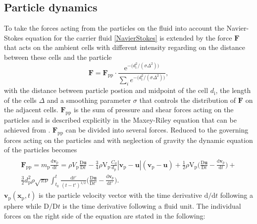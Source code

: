 \documentclass[11pt,a4paper,openany,oneside,parskip=half*]{article}
\renewcommand*\vec[1]{\boldsymbol{#1}}
\begin{document}
\subsection{Particle dynamics} %
To take the forces acting from the particles on the fluid into account the Navier-Stokes equation for the carrier fluid \eqref{NavierStokes} is extended by the force $\vec{F}$ that acts on the ambient cells with different intensity regarding on the distance between these cells and the particle
\begin{equation}
\vec{F} = \vec{F}_\mathrm{pp} \cdot \frac{\mathrm{e}^{- \big(d_\mathrm{i}^\mathrm{2}/(\sigma \Delta^\mathrm{2})\big)}}{\sum \limits_{i} e^{- \big(d_\mathrm{i}^\mathrm{2}/(\sigma \Delta^\mathrm{2}) \big)}},
\end{equation}
with the distance between particle postion and midpoint of the cell $d_\mathrm{i}$, the length of the cells $\Delta$ and a smoothing parameter $\sigma$ that controls the distribution of $\vec{F}$ on the adjacent cells.
$\vec{F}_\mathrm{pp}$ is the sum of pressure and shear forces acting on the particles and is described explicitly in the Maxey-Riley equation that can be achieved from \cite{EquationOfMotionForASmallRigidSphereInANonuniformFlow}.
$\vec{F}_\mathrm{pp}$ can be divided into several forces. 
Reduced to the governing forces acting on the particles and with neglection of gravity the dynamic equation of the particles becomes
\begin{multline} \label{navier_stokes_particle}
\\ \vec{F}_\mathrm{pp} = m_\mathrm{p} \frac{\mathrm{d}\vec{v}_\mathrm{p}}{\mathrm{d}t} =\rho V_\mathrm{p}\frac{\mathrm{D}\vec{u}}{\mathrm{D}t} -\frac{3}{4}\rho \mathrm{V}_\mathrm{p} \frac{C_\mathrm{d}}{d_\mathrm{p}}|\vec{v}_\mathrm{p}-\vec{u}|(\vec{v}_\mathrm{p}-\vec{u})+ \frac{1}{2}\rho \mathrm{V}_\mathrm{p} \biggl(\frac{\mathrm{D}\vec{u}}{\mathrm{D}t}-\frac{\mathrm{d}\vec{v}_\mathrm{p}}{\mathrm{d}t}\biggl) + 
\\ \frac{3}{2}d_\mathrm{p}^\mathrm{2}\rho\sqrt{\pi\nu}\int_{t_\mathrm{0}}^{t} \frac{\mathrm{d}t'}{(t-t')^\mathrm{1/2}} \biggl(\frac{\mathrm{D}\vec{u}}{\mathrm{D}t'}- \frac{\mathrm{d}\vec{v}_\mathrm{p}}{\mathrm{d}t'}\biggl).
\end{multline}
$\vec{v}_\mathrm{p}(\vec{x}_\mathrm{p},t)$ is the particle velocity vector with the time derivative $\mathrm{d}/\mathrm{d}t$ following a sphere while $\mathrm{D}/\mathrm{D}t$  is the time derivative following a fluid unit. 
The individual forces on the right side of the equation are stated in the following:
\end{document}
